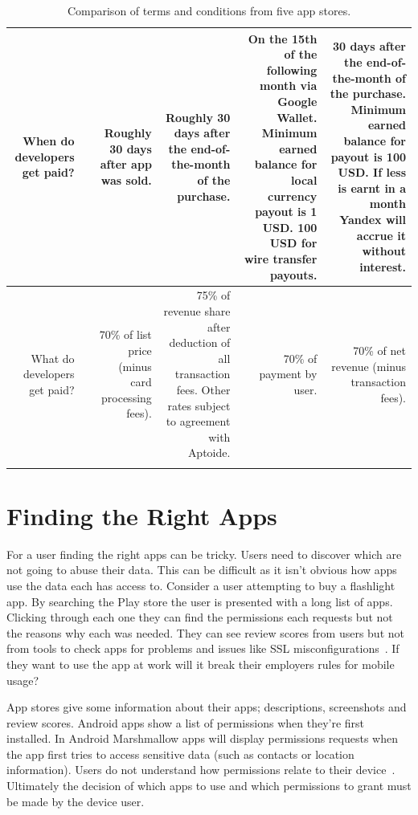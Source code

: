 \documentclass[thesis.tex]{subfiles}
\begin{document}
{{\begin{longtable}{RRRRRR}
      \\\midrule
    When do developers get paid?
      & 
      & Roughly 30 days after app was sold.
      & Roughly 30 days after the end-of-the-month of the purchase.
      & On the 15th of the following month via Google Wallet.  Minimum earned balance for local currency payout is 1 USD. 100 USD for wire transfer payouts.
      & 30 days after the end-of-the-month of the purchase.  Minimum earned balance for payout is 100 USD.  If less is earnt in a month Yandex will accrue it without interest.
      \\\midrule
    What do developers get paid?
      &
      & 70\% of list price (minus card processing fees).
      & 75\% of revenue share after deduction of all transaction fees.  Other rates subject to agreement with Aptoide.
      & 70\% of payment by user.
      & 70\% of net revenue (minus transaction fees).
      \\
    \bottomrule
    \caption{Comparison of terms and conditions from five app stores.}
    \label{tab:terms-and-conditions}
  \end{longtable}
}}



\section{Finding the Right Apps}

For a user finding the right apps can be tricky.
Users need to discover which are not going to abuse their data.
This can be difficult as it isn't obvious how apps use the data each has access to.
Consider a user attempting to buy a flashlight app.
By searching the Play store the user is presented with a long list of apps.
Clicking through each one they can find the permissions each requests but not the reasons why each was needed.
They can see review scores from users but not from tools to check apps for problems and issues like SSL misconfigurations~\cite{fahl_why_2012}.
If they want to use the app at work will it break their employers rules for mobile usage?

App stores give some information about their apps; descriptions, screenshots and review scores.
Android apps show a list of permissions when they're first installed.
In Android Marshmallow apps will display permissions requests when the app first tries to access sensitive data (such as contacts or location information).
Users do not understand how permissions relate to their device~\cite{felt_android_2012,thompson_when_2013}.
Ultimately the decision of which apps to use and which permissions to grant must be made by the device user.
\end{document}
